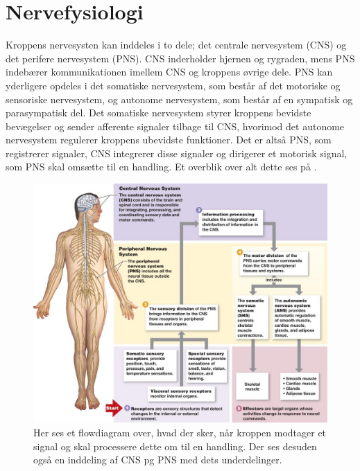 \chapter{Nervefysiologi}\label{AppNerve}
Kroppens nervesysten kan inddeles i to dele; det centrale nervesystem (CNS) og det perifere nervesystem (PNS). CNS inderholder hjernen og rygraden, mens PNS indebærer kommunikationen imellem CNS og kroppens øvrige dele. PNS kan yderligere opdeles i det somatiske nervesystem, som består af det motoriske og sensoriske nervesystem, og autonome nervesystem, som består af en sympatisk og parasympatisk del. Det somatiske nervesystem styrer kroppens bevidste bevægelser og sender afferente signaler tilbage til CNS, hvorimod det autonome nervesystem regulerer kroppens ubevidste funktioner. Det er altså PNS, som registrerer signaler, CNS integrerer disse signaler og dirigerer et motorisk signal, som PNS skal omsætte til en handling. \cite{Martini2012,Stanfield2014} Et overblik over alt dette ses på .

\begin{figure}[H]
	\centering
	\includegraphics[scale=0.8]{figures/bProblemanalyse/Nervesys.jpg}
	\caption{Her ses et flowdiagram over, hvad der sker, når kroppen modtager et signal og skal processere dette om til en handling. Der ses desuden også en inddeling af CNS pg PNS med dets underdelinger. \cite{2015}}
	\label{Nersys}
\end{figure}

